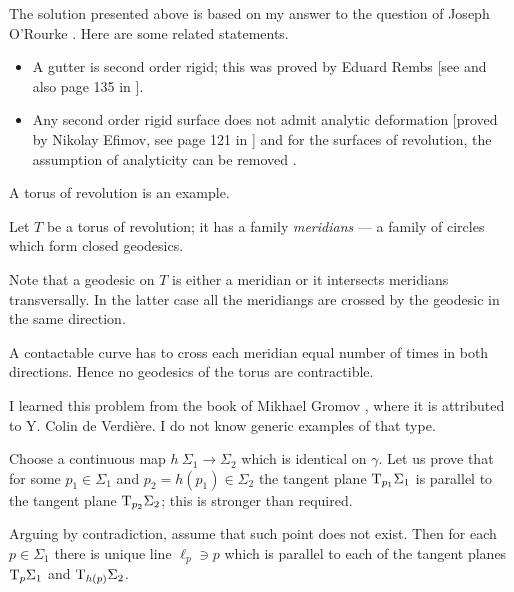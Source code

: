 The solution presented above is based on my answer 
to the question of Joseph O'Rourke \cite[see][]{rourke}.
Here are some related statements.
\begin{itemize}
\item A gutter is second order rigid;
this was proved by Eduard Rembs
[see  and also page 135 in ].
\item Any second order rigid surface does not admit analytic deformation 
[proved by Nikolay Efimov, see page 121 in ]
and for the surfaces of revolution, the assumption of analyticity can be removed 
\cite[proved by Idzhad Sabitov, see][]{sabitov}.
\end{itemize}









A torus of revolution is an example.

\medskip

Let $T$ be a torus of revolution;
it has a family {}\emph{meridians} --- a family of circles which form closed geodesics.

Note that a geodesic on $T$ is either a meridian
or it intersects meridians transversally.
In the latter case all the meridiangs are crossed by the geodesic in the same direction.

A contactable curve has to cross each meridian equal number of times in both directions.
Hence no geodesics of the torus are contractible.\qeds 




I learned this problem 
from the book of Mikhael Gromov \cite[see][]{gromov-MetStr},
where it is attributed to Y. Colin de Verdi\`ere.
I do not know generic examples of that type.

Choose a continuous map $h\:\Sigma_1\to \Sigma_2$
which is identical on $\gamma$.
Let us prove that for some $p_1\in \Sigma_1$ and $p_2=h(p_1)\in \Sigma_2$
the tangent plane $\mathrm{T}_{p_1} \Sigma_1$ is parallel to the tangent plane $\mathrm{T}_{p_2} \Sigma_2$;
this is stronger than required.

\medskip

Arguing by contradiction,
assume that such point does not exist.
Then for each $p\in\Sigma_1$
there is unique line $\ell_p\ni p$ 
which is parallel to each of the tangent planes $\mathrm{T}_{p} \Sigma_1$ and $\mathrm{T}_{h(p)} \Sigma_2$.


